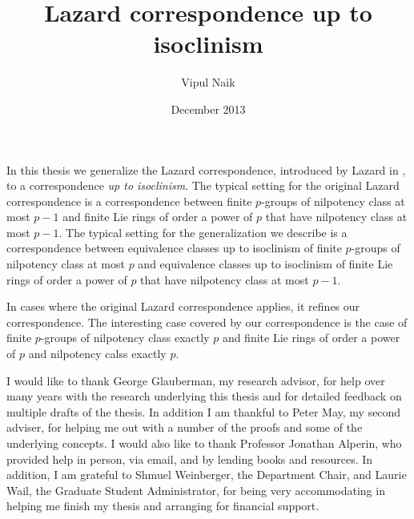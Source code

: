\documentclass{ucetd}
\title{Lazard correspondence up to isoclinism}
\author{Vipul Naik}
\date{December 2013}
\begin{document}
\maketitle



\tableofcontents

\abstract

In this thesis we generalize the Lazard correspondence, introduced by
Lazard in \cite{Lazardsoriginal}, to a correspondence {\em up to
  isoclinism}. The typical setting for the original Lazard
correspondence is a correspondence between finite $p$-groups of
nilpotency class at most $p - 1$ and finite Lie rings of order a power
of $p$ that have nilpotency class at most $p - 1$. The typical setting
for the generalization we describe is a correspondence between
equivalence classes up to isoclinism of finite $p$-groups of
nilpotency class at most $p$ and equivalence classes up to isoclinism
of finite Lie rings of order a power of $p$ that have nilpotency class at
most $p - 1$.

In cases where the original Lazard correspondence applies, it refines
our correspondence. The interesting case covered by our correspondence
is the case of finite $p$-groups of nilpotency class exactly $p$ and
finite Lie rings of order a power of $p$ and nilpotency calss exactly
$p$.

\acknowledgments

I would like to thank George Glauberman, my research advisor, for help
over many years with the research underlying this thesis and for
detailed feedback on multiple drafts of the thesis. In addition I am
thankful to Peter May, my second adviser, for helping me out with a
number of the proofs and some of the underlying concepts. I would also
like to thank Professor Jonathan Alperin, who provided help in person,
via email, and by lending books and resources. In addition, I am
grateful to Shmuel Weinberger, the Department Chair, and Laurie Wail,
the Graduate Student Administrator, for being very accommodating in
helping me finish my thesis and arranging for financial support.
\end{document}
